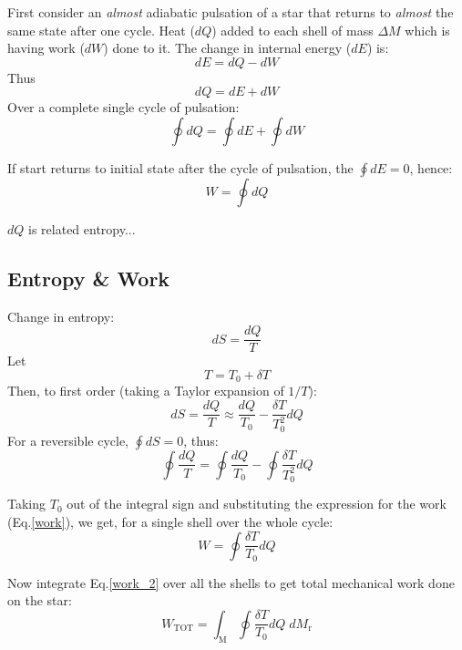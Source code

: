 \documentclass{spy}
\begin{document}
First consider an \textit{almost} adiabatic pulsation of a star that returns to \textit{almost} the same state after one cycle. Heat (\(dQ\)) added to each shell of mass \(\Delta M\) which is having work (\(dW\)) done to it. The change in internal energy (\(dE\)) is:
\begin{equation}
     dE = dQ - dW
\end{equation}
Thus
\begin{equation}
     dQ = dE + dW
\end{equation}
Over a complete single cycle of pulsation:
\begin{equation}
    \oint dQ = \oint dE + \oint dW
\end{equation}

If start returns to initial state after the cycle of pulsation, the \(\oint dE = 0\), hence:
\begin{equation}
    W = \oint dQ
    \label{work}
\end{equation}

\(dQ\) is related entropy...


\subsection{Entropy \& Work}
Change in entropy:
\begin{equation}
    dS = \frac{dQ}{T}
\end{equation}
Let
\begin{equation}
    T = T_\mathrm{0} + \delta T
\end{equation}
Then, to first order (taking a Taylor expansion of \(1/T\)):
\begin{equation}
    dS = \frac{dQ}{T} \approx \frac{dQ}{T_\mathrm{0}} - \frac{\delta T}{T^2_\mathrm{0}} dQ
\end{equation}
For a reversible cycle, \(\oint dS = 0\), thus:
\begin{equation}
    \oint \frac{dQ}{T} = \oint \frac{dQ}{T_\mathrm{0}} - \oint \frac{\delta T}{T^2_\mathrm{0}} dQ
\end{equation}

Taking \(T_\mathrm{0}\) out of the integral sign and substituting the expression for the work (Eq.\ref{work}), we get, for a single shell over the whole cycle:
\begin{equation}
    W = \oint \frac{\delta T}{T_\mathrm{0}} dQ
    \label{work_2}
\end{equation}

Now integrate Eq.\ref{work_2} over all the shells to get total mechanical work done on the star:
\begin{equation}
    W_\mathrm{TOT} = \int_\mathrm{M} \oint \frac{\delta T}{T_\mathrm{0}} dQ \; dM_\mathrm{r}
\end{equation}
\end{document}
